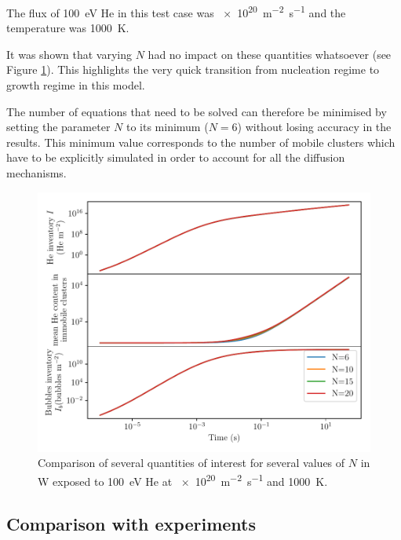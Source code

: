 The flux of \SI{100}{eV} He in this test case was \SI{e20}{m^{-2} s^{-1}} and the temperature was \SI{1000}{K}. 

It was shown that varying $N$ had no impact on these quantities whatsoever (see Figure \ref{fig:N variation}).
This highlights the very quick transition from nucleation regime to growth regime in this model.

The number of equations that need to be solved can therefore be minimised by setting the parameter $N$ to its minimum ($N=6$) without losing accuracy in the results.
This minimum value corresponds to the number of mobile clusters which have to be explicitly simulated in order to account for all the diffusion mechanisms.

\begin{figure} [h]
    \centering
    \includegraphics[width=\linewidth]{Figures/Chapter4/varying_N.pdf}
    \caption{Comparison of several quantities of interest for several values of $N$ in W exposed to \SI{100}{eV} He at \SI{e20}{m^{-2}.s^{-1}} and \SI{1000}{K}.}
    \label{fig:N variation}
\end{figure}

\subsection{Comparison with experiments}

